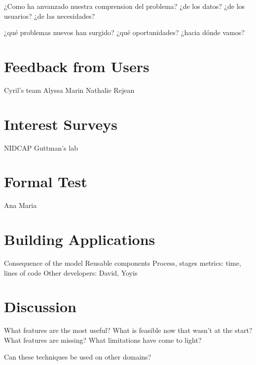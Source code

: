 

¿Como ha anvanzado nuestra comprension del problema?
¿de los datos?
¿de los usuarios?
¿de las necesidades?

¿qué problemas nuevos han surgido?
¿qué oportunidades?
¿hacia dónde vamos?

\section{Feedback from Users}

Cyril's team
Alyssa
Marin
Nathalie
Rejean

\section{Interest Surveys}
NIDCAP
Guttman's lab

\section{Formal Test}

Ana Maria

\section{Building Applications}

Consequence of the model
Reusable components
Process, stages
metrics: time, lines of code
Other developers: David, Yoyis


\section{Discussion}

What features are the most useful?
What is feasible now that wasn't at the start?
What features are missing?
What limitations have come to light?

Can these techniques be used on other domains?



